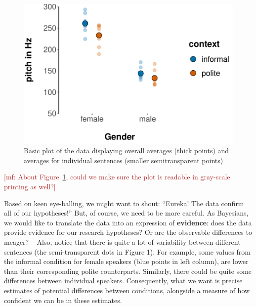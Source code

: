 \documentclass[nobib]{tufte-handout}
\renewcommand{\mf}[1]{\textcolor{firebrick}{[mf: #1]}}
\begin{document}
\begin{figure}[t]
  \centering
    \includegraphics[width = \textwidth]{pics/basic_data_plot.pdf}
    \caption{Basic plot of the data displaying overall averages (thick points) and averages for individual sentences (smaller semitransparent points)}
     \label{fig:BasicPlotData_data}
\end{figure}

\mf{About Figure~\ref{fig:BasicPlotData_data}, could we make sure the plot is readable in
  gray-scale printing as well?}

Based on keen eye-balling, we might want to shout: ``Eureka! The data confirm all of our
hypotheses!'' But, of course, we need to be more careful. As Bayesians, we would like to
translate the data into an expression of \textbf{evidence}: does the data provide evidence for
our research hypotheses? Or are the observable differences to meager? -- Also, notice that
there is quite a lot of variability between different sentences (the semi-transparent dots in Figure 1).
For example, some values from the informal condition for female speakers (blue points in left
column), are lower than their corresponding polite counterparts. Similarly, there could be
quite some differences between individual speakers. Consequently, what we want is precise
estimates of potential differences between conditions, alongside a measure of how confident we can be in these estimates.
\end{document}
